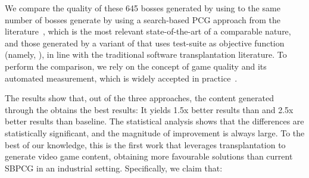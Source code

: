 We compare the quality of these 645 bosses generated  by using \ApproachName{} to the same number of bosses generate by using a search-based PCG approach from the literature~\cite{gallotta2022evolving}, which is the most relevant state-of-the-art of a comparable nature, and those generated by a variant of \ApproachName{} that uses test-suite as objective function (namely, \timhotep{}), in line with the traditional software transplantation literature. To perform the comparison, we rely on the concept of game quality and its automated measurement, which is widely accepted in practice~\cite{browne2010evolutionary}. 

The results show that, out of the three approaches, the content generated through the \ApproachName{}  obtains the best results: It yields 1.5x better results than \timhotep{} and 2.5x better results than baseline. The statistical analysis shows that the differences are statistically significant, and the magnitude of improvement is always large.
To the best of our knowledge, this is the first work that leverages transplantation to generate video game content, obtaining more favourable solutions than current SBPCG in an industrial setting. Specifically, we claim that:

